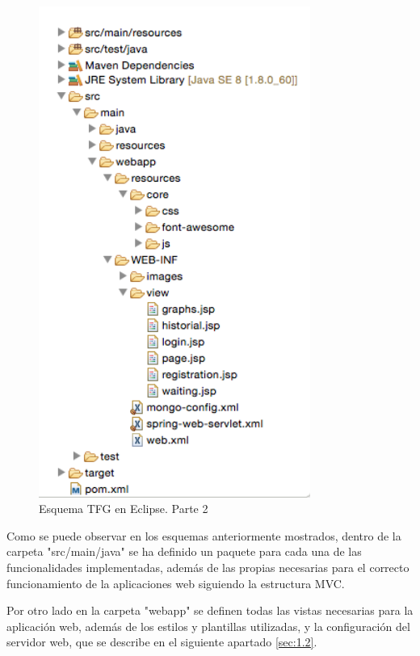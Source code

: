 \begin{figure}[H]
\centering
\includegraphics[width=3.5in]{figuras/esquemaFrontend.png}
\caption{Esquema TFG en Eclipse. Parte 2} \label{fig:esqEclipseF}
\end{figure}

Como se puede observar en los esquemas anteriormente mostrados, dentro de la carpeta "src/main/java" se ha definido un paquete para cada una de las funcionalidades implementadas, además de las propias necesarias para el correcto funcionamiento de la aplicaciones web siguiendo la estructura MVC. 

Por otro lado en la carpeta "webapp" se definen todas las vistas necesarias para la aplicación web, además de los estilos y plantillas utilizadas, y la configuración del servidor web, que se describe en el siguiente apartado \ref{sec:1.2}.


